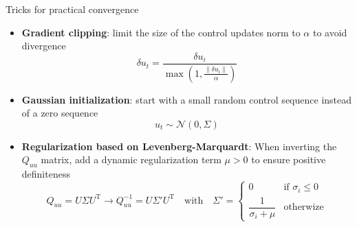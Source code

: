 \documentclass[aspectratio=169]{beamer}
\begin{document}
\begin{frame}{Tricks for practical convergence}
    \begin{itemize}
        \item \textbf{Gradient clipping}: limit the size of the control updates norm to $\alpha$ to avoid divergence
              \begin{equation*}
                  \delta u_t = \frac{\delta u_i}{\max\left(1, \frac{\|\delta u_i\|}{\alpha}\right)}
              \end{equation*}
        \item \textbf{Gaussian initialization}: start with a small random control sequence instead of a zero sequence
              \begin{equation*}
                  u_t \sim \mathcal{N}(0, \Sigma)
              \end{equation*}
        \item \textbf{Regularization based on Levenberg-Marquardt}: When inverting the $Q_{uu}$ matrix, add a dynamic regularization term $\mu > 0$ to ensure positive definiteness
              \begin{equation*}
                  Q_{uu} = U\Sigma U^{\mathrm{T}} \rightarrow Q_{uu}^{-1} = U\Sigma' U^{\mathrm{T}}
                  \quad\text{with}\quad
                  \Sigma' = \begin{cases}
                      0                         & \text{if $\sigma_i\leqslant 0$} \\
                      \dfrac{1}{\sigma_i + \mu} & \text{otherwize}
                  \end{cases}
              \end{equation*}
    \end{itemize}
\end{frame}
\end{document}
